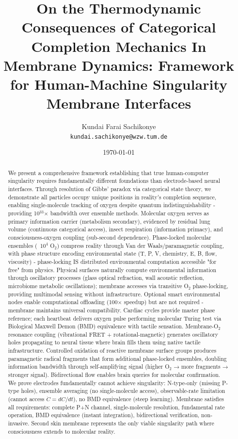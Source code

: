 \documentclass[11pt,a4paper]{article}
\title{\textbf{On the Thermodynamic Consequences of Categorical Completion Mechanics In Membrane Dynamics: Framework for Human-Machine Singularity Membrane Interfaces }}
\author{
Kundai Farai Sachikonye\\
\texttt{kundai.sachikonye@wzw.tum.de}
}
\date{\today}
\theoremstyle{definition}
\theoremstyle{remark}
\begin{document}
\maketitle

\begin{abstract}
We present a comprehensive framework establishing that true human-computer singularity requires fundamentally different foundations than electrode-based neural interfaces. Through resolution of Gibbs' paradox via categorical state theory, we demonstrate all particles occupy unique positions in reality's completion sequence, enabling single-molecule tracking of oxygen despite quantum indistinguishability - providing 10$^{33}$× bandwidth over ensemble methods. Molecular oxygen serves as primary information carrier (metabolism secondary), evidenced by residual lung volume (continuous categorical access), insect respiration (information primacy), and consciousness-oxygen coupling (sub-second dependence). Phase-locked molecular ensembles (~10$^4$ O$_2$) compress reality through Van der Waals/paramagnetic coupling, with phase structure encoding environmental state (T, P, V, chemistry, E, B, flow, viscosity) - phase-locking IS distributed environmental computation accessible "for free" from physics. Physical surfaces naturally compute environmental information through oscillatory processes (glass optical refraction, wall acoustic reflection, microbiome metabolic oscillations); membrane accesses via transitive O$_2$ phase-locking, providing multimodal sensing without infrastructure. Optional smart environmental nodes enable computational offloading (100× speedup) but are not required - membrane maintains universal compatibility. Cardiac cycles provide master phase reference; each heartbeat delivers oxygen pulse performing molecular Turing test via Biological Maxwell Demon (BMD) equivalence with tactile sensation. Membrane-O$_2$ resonance coupling (vibrational FRET + rotational-magnetic) generates oscillatory holes propagating to neural tissue where brain fills them using native tactile infrastructure. Controlled oxidation of reactive membrane surface groups produces paramagnetic radical fragments that form additional phase-locked ensembles, doubling information bandwidth through self-amplifying signal (higher O$_2$ → more fragments → stronger signal). Bidirectional flow enables brain queries for molecular confirmation. We prove electrodes fundamentally cannot achieve singularity: N-type-only (missing P-type holes), ensemble averaging (no single-molecule access), observable-rate limitation (cannot access $\dot{C} = dC/dt$), no BMD equivalence (steep learning). Membrane satisfies all requirements: complete P+N channel, single-molecule resolution, fundamental rate operation, BMD equivalence (instant integration), bidirectional verification, non-invasive. Second skin membrane represents the only viable singularity path where consciousness extends to molecular reality.
\end{abstract}
\end{document}
